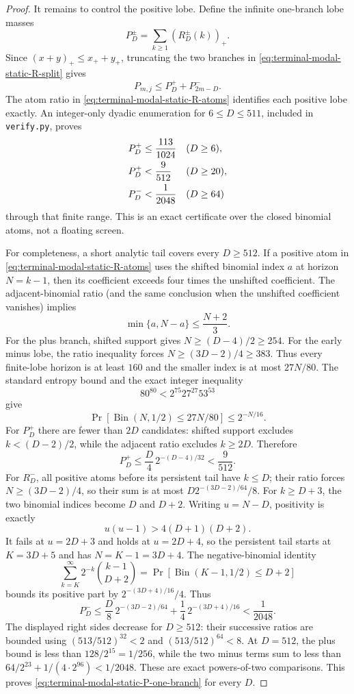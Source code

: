 \begin{proof}
It remains to control the positive lobe.  Define the infinite one-branch
lobe masses
\[
 P_D^\pm=\sum_{k\ge1}(R_D^\pm(k))_+.
\]
Since $(x+y)_+\le x_++y_+$, truncating the two branches in
\eqref{eq:terminal-modal-static-R-split} gives
\begin{equation}
 P_{m,j}\le P_D^++P_{2m-D}^-.
 \label{eq:terminal-modal-static-P-branches}
\end{equation}
The atom ratio in \eqref{eq:terminal-modal-static-R-atoms} identifies each
positive lobe exactly.  An integer-only dyadic enumeration for
$6\le D\le511$, included in \texttt{verify.py}, proves
\begin{align}
 P_D^+&\le\frac{113}{1024} &&(D\ge6),\notag\\
 P_D^+&<\frac9{512} &&(D\ge20),\notag\\
 P_D^-&<\frac1{2048} &&(D\ge64)
 \label{eq:terminal-modal-static-P-one-branch}
\end{align}
through that finite range.  This is an exact certificate over the closed
binomial atoms, not a floating screen.

For completeness, a short analytic tail covers every $D\ge512$.  If a
positive atom in \eqref{eq:terminal-modal-static-R-atoms} uses the shifted
binomial index $a$ at horizon $N=k-1$, then its coefficient exceeds four
times the unshifted coefficient.  The adjacent-binomial ratio (and the same
conclusion when the unshifted coefficient vanishes) implies
\[
 \min\{a,N-a\}\le\frac{N+2}{3}.
\]
For the plus branch, shifted support gives
$N\ge(D-4)/2\ge254$.  For the early minus lobe, the ratio inequality forces
$N\ge(3D-2)/4\ge383$.  Thus every finite-lobe horizon is at least $160$ and
the smaller index is at most $27N/80$.  The standard entropy bound and the
exact integer inequality
\[
 80^{80}<2^{75}27^{27}53^{53}
\]
give
\begin{equation}
 \Pr[\operatorname{Bin}(N,1/2)\le27N/80]
 \le2^{-N/16}.
 \label{eq:terminal-modal-static-entropy-tail}
\end{equation}
For $P_D^+$ there are fewer than $2D$ candidates: shifted support excludes
$k<(D-2)/2$, while the adjacent ratio excludes $k\ge2D$.  Therefore
\[
 P_D^+\le\frac D4\,2^{-(D-4)/32}<\frac9{512}.
\]
For $R_D^-$, all positive atoms before its persistent tail have $k\le D$;
their ratio forces $N\ge(3D-2)/4$, so their sum is at most
$D2^{-(3D-2)/64}/8$.  For $k\ge D+3$, the two binomial indices become
$D$ and $D+2$.  Writing $u=N-D$, positivity is exactly
\[
 u(u-1)>4(D+1)(D+2).
\]
It fails at $u=2D+3$ and holds at $u=2D+4$, so the persistent tail starts
at $K=3D+5$ and has $N=K-1=3D+4$.  The negative-binomial identity
\[
 \sum_{k=K}^{\infty}2^{-k}\binom{k-1}{D+2}
 =\Pr[\operatorname{Bin}(K-1,1/2)\le D+2]
\]
bounds its positive part by $2^{-(3D+4)/16}/4$.  Thus
\[
 P_D^-\le\frac D8\,2^{-(3D-2)/64}
 +\frac14\,2^{-(3D+4)/16}<\frac1{2048}.
\]
The displayed right sides decrease for $D\ge512$: their successive ratios
are bounded using
$(513/512)^{32}<2$ and $(513/512)^{64}<8$.  At $D=512$, the plus bound is
less than $128/2^{15}=1/256$, while the two minus terms sum to less than
$64/2^{23}+1/(4\cdot2^{96})<1/2048$.  These are exact powers-of-two
comparisons.  This proves
\eqref{eq:terminal-modal-static-P-one-branch} for every $D$.


\end{proof}

